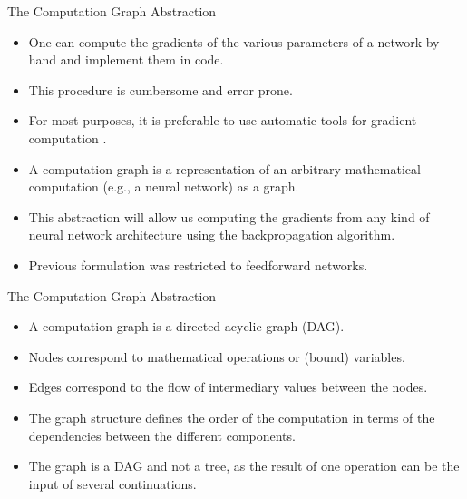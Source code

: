 \documentclass[handout]{beamer}
\begin{document}
\begin{frame}{The Computation Graph Abstraction}
\begin{scriptsize}
\begin{itemize}
\item  One can compute the gradients of the various parameters of a network by hand and implement them in code.

\item This procedure is cumbersome and error prone.

\item For most purposes, it is preferable to use automatic tools for gradient computation \cite{bengio2012practical}.

\item A computation graph is a representation of an arbitrary mathematical computation (e.g., a neural network) as a graph.

\item This abstraction will allow us computing the gradients from any kind of neural network architecture using the backpropagation algorithm. 

\item Previous formulation was restricted to feedforward networks.

\end{itemize}
\end{scriptsize}
\end{frame}


\begin{frame}{The Computation Graph Abstraction}
\begin{scriptsize}
\begin{itemize}
\item A computation graph is a directed acyclic graph (DAG).

\item Nodes correspond to mathematical operations or (bound) variables.

\item Edges correspond to the flow of intermediary values between the nodes.

\item The graph structure defines the order of the computation in terms of the dependencies  between the different components.

\item The graph is a DAG and not a tree, as the result of one operation can be the input of several continuations.

\end{itemize}
\end{scriptsize}
\end{frame}
\end{document}

